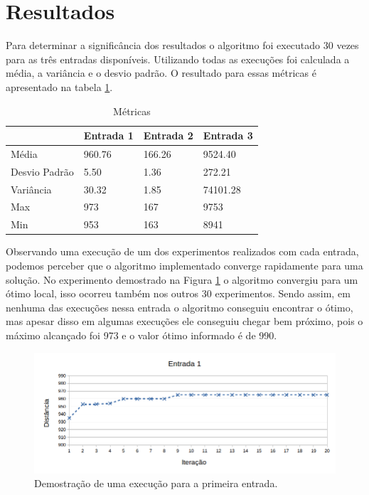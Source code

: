 \documentclass[a4paper, 12pt]{article}
\begin{document}
\newpage

\section{Resultados}
Para determinar a significância dos resultados o algoritmo foi executado 30 vezes para as três entradas disponíveis. Utilizando todas as execuções foi calculada a média, a variância e o desvio padrão. O resultado para essas métricas é apresentado na tabela \ref{estatisticas}.

\begin{table}[!htb]
\centering
\caption{Métricas}
\label{estatisticas}
\begin{tabular}{|l|l|l|l|}
\hline
              & Entrada 1 & Entrada 2 & Entrada 3   \\\hline
Média         & 960.76    & 166.26    &  9524.40    \\
Desvio Padrão & 5.50      & 1.36      &  272.21     \\
Variância     & 30.32     & 1.85      &   74101.28   \\
Max           & 973       & 167       &   9753        \\
Min           & 953       & 163       &   8941      \\\hline
\end{tabular}
\end{table}



Observando uma execução de um dos experimentos realizados com cada entrada, podemos perceber que o algoritmo implementado converge rapidamente para uma solução. No experimento demostrado na Figura \ref{fig:fig1}  o algoritmo convergiu para um ótimo local, isso ocorreu também nos outros 30 experimentos. Sendo assim, em nenhuma das execuções nessa entrada o algoritmo conseguiu encontrar o ótimo, mas apesar disso em algumas execuções ele conseguiu chegar bem próximo, pois o máximo alcançado foi 973 e o valor ótimo informado é de 990.



\begin{figure}[!htb]
\centering
\includegraphics[scale=0.64]{entrada1.png}
\caption{Demostração de uma execução para a primeira entrada.}
\label{fig:fig1}
\end{figure}
\end{document}
